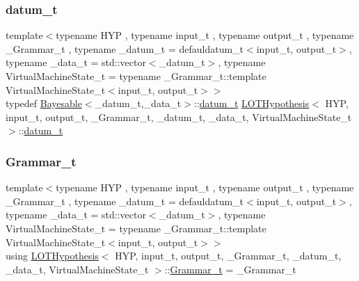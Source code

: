 \subsubsection{\texorpdfstring{datum\+\_\+t}{datum\_t}}
{\footnotesize\ttfamily template$<$typename H\+YP , typename input\+\_\+t , typename output\+\_\+t , typename \+\_\+\+Grammar\+\_\+t , typename \+\_\+datum\+\_\+t  = defauldatum\+\_\+t$<$input\+\_\+t, output\+\_\+t$>$, typename \+\_\+data\+\_\+t  = std\+::vector$<$\+\_\+datum\+\_\+t$>$, typename Virtual\+Machine\+State\+\_\+t  = typename \+\_\+\+Grammar\+\_\+t\+::template Virtual\+Machine\+State\+\_\+t$<$input\+\_\+t, output\+\_\+t$>$$>$ \\
typedef \hyperlink{class_bayesable}{Bayesable}$<$\+\_\+datum\+\_\+t,\+\_\+data\+\_\+t$>$\+::\hyperlink{class_l_o_t_hypothesis_ae36b1f113f45ee5ac82660028672739b}{datum\+\_\+t} \hyperlink{class_l_o_t_hypothesis}{L\+O\+T\+Hypothesis}$<$ H\+YP, input\+\_\+t, output\+\_\+t, \+\_\+\+Grammar\+\_\+t, \+\_\+datum\+\_\+t, \+\_\+data\+\_\+t, Virtual\+Machine\+State\+\_\+t $>$\+::\hyperlink{class_l_o_t_hypothesis_ae36b1f113f45ee5ac82660028672739b}{datum\+\_\+t}}

\mbox{\label{class_l_o_t_hypothesis_a8006204013d471860e54c49d19edbace}} 
\subsubsection{\texorpdfstring{Grammar\+\_\+t}{Grammar\_t}}
{\footnotesize\ttfamily template$<$typename H\+YP , typename input\+\_\+t , typename output\+\_\+t , typename \+\_\+\+Grammar\+\_\+t , typename \+\_\+datum\+\_\+t  = defauldatum\+\_\+t$<$input\+\_\+t, output\+\_\+t$>$, typename \+\_\+data\+\_\+t  = std\+::vector$<$\+\_\+datum\+\_\+t$>$, typename Virtual\+Machine\+State\+\_\+t  = typename \+\_\+\+Grammar\+\_\+t\+::template Virtual\+Machine\+State\+\_\+t$<$input\+\_\+t, output\+\_\+t$>$$>$ \\
using \hyperlink{class_l_o_t_hypothesis}{L\+O\+T\+Hypothesis}$<$ H\+YP, input\+\_\+t, output\+\_\+t, \+\_\+\+Grammar\+\_\+t, \+\_\+datum\+\_\+t, \+\_\+data\+\_\+t, Virtual\+Machine\+State\+\_\+t $>$\+::\hyperlink{class_l_o_t_hypothesis_a8006204013d471860e54c49d19edbace}{Grammar\+\_\+t} =  \+\_\+\+Grammar\+\_\+t}



